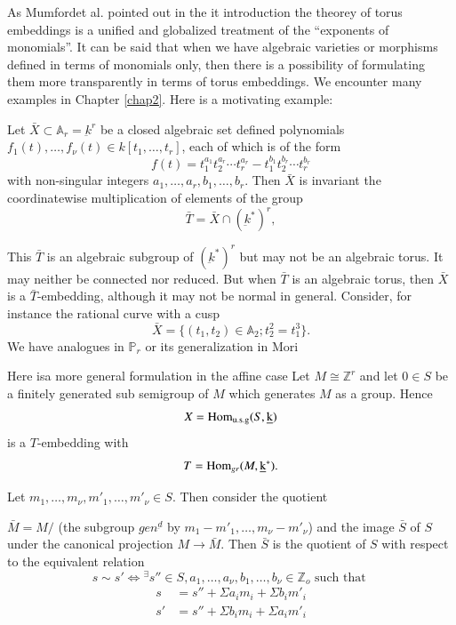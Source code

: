  As Mumford\pageoriginale et al. \cite{keyTE}\break pointed out in the it
 introduction the theorey  of torus embeddings  is a unified and
 globalized treatment of the ``exponents of monomials''. It can be
 said that when we have algebraic varieties or morphisms defined in
 terms of monomials only, then there is a possibility of formulating
 them more transparently in terms of torus embeddings. We encounter
 many examples in Chapter \ref{chap2}. Here is a motivating example: 
 
 Let $\bar{X} \subset \mathbb{A}_r = \underbar{k}^r$ be a closed
 algebraic set defined polynomials $f_1(t), \ldots , f_\nu (t) \in k
 [t_1, \ldots , t_r]$, each of which is of the form    
 $$
 f(t)= t_1^{a_1} t_2^{a_r} \cdots t_r^{a_r}- t_1^{b_1} t_2^{b_r}
 \cdots t_r^{b_r}  
 $$
 with non-singular integers $a_1, \ldots , a_r, b_1, \ldots ,
 b_r$. Then $\bar{X}$ is invariant the coordinatewise multiplication
 of elements of the group 
 $$
 \bar{T}= \bar{X} \cap (\underbar{k}^*)^r,
 $$
 
 This $\bar{T}$ is an algebraic subgroup of $(\underbar{k}^*)^r$ but
 may not be an algebraic torus. It may neither be connected nor
 reduced. But when $\bar{T}$ is an algebraic torus, then $\bar{X}$  is
 a $\bar{T}$-embedding, although it may not be normal in
 general. Consider, for instance the rational curve with a cusp 
 $$
 \bar{X}= \{(t_1, t_2) \in \mathbb{A}_2 ; t_2^2 =t_1 ^3\}.
 $$ 
 We have analogues in $\mathbb{P}_r$ or its generalization in Mori \cite{keyM3}
 
 Here is\pageoriginale a more general formulation in the  affine case
 Let $M \cong  \mathbb{Z}^r$ and let $0 \in  S$ be a finitely
 generated sub  semigroup of $M$ which generates $M$ as a group. Hence   
 $$
 X=\operatorname{Hom}_{\text{u.s.g}}(S,\underbar{k})
 $$  
 is a $T$-embedding with 
 $$
 T=\operatorname{Hom}_{gr}(M, \underbar{k}^*). 
 $$

 Let $m_1, \ldots , m_\nu , m'_1 , \ldots , m'_\nu \in S $. Then
 consider the quotient 
 
  $\bar{M} = M/$ (the subgroup  $gen^{\underbar{d}}$ by $m_1- m'_1 ,
 \ldots , m_\nu - m'_\nu$) and the image  $\bar{S}$ of $S$ under the
 canonical projection $M \to \bar{M}$. Then  $\bar{S}$ is the
 quotient of $S$ with respect to the equivalent relation  
 $$
 s \sim s' \Leftrightarrow {^\exists} s'' \in S, a_1, \ldots , 
 a_\nu, b_1, \ldots ,b_\nu  \in \mathbb{Z}_o \text{ such that } 
 $$
 \begin{align*}
s &=s'' + \Sigma a_i m_i + \Sigma b_i m'_i\\
s'&=s'' + \Sigma b_i m_i + \Sigma a_i m'_i
 \end{align*} 

